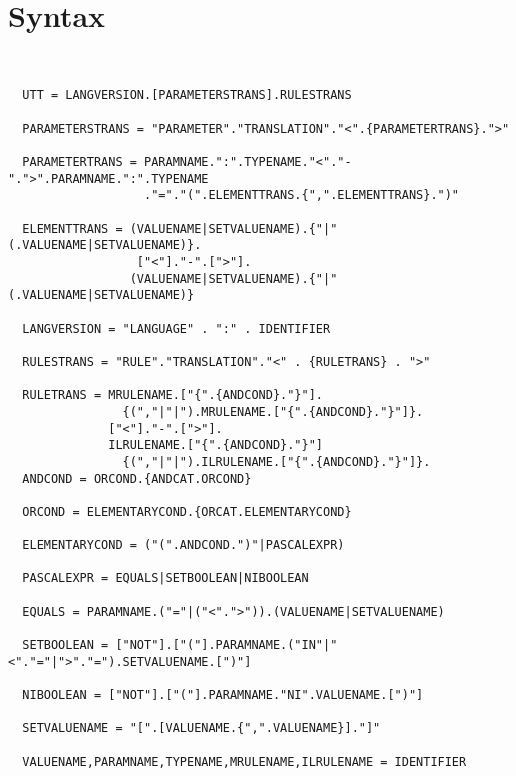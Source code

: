\section{Syntax}
\begin{verbatim}


  UTT = LANGVERSION.[PARAMETERSTRANS].RULESTRANS

  PARAMETERSTRANS = "PARAMETER"."TRANSLATION"."<".{PARAMETERTRANS}.">"

  PARAMETERTRANS = PARAMNAME.":".TYPENAME."<"."-".">".PARAMNAME.":".TYPENAME
                   ."="."(".ELEMENTTRANS.{",".ELEMENTTRANS}.")"

  ELEMENTTRANS = (VALUENAME|SETVALUENAME).{"|"(.VALUENAME|SETVALUENAME)}.
                  ["<"]."-".[">"].
                 (VALUENAME|SETVALUENAME).{"|"(.VALUENAME|SETVALUENAME)}

  LANGVERSION = "LANGUAGE" . ":" . IDENTIFIER

  RULESTRANS = "RULE"."TRANSLATION"."<" . {RULETRANS} . ">"

  RULETRANS = MRULENAME.["{".{ANDCOND}."}"].
                {(","|"|").MRULENAME.["{".{ANDCOND}."}"]}.
              ["<"]."-".[">"].
              ILRULENAME.["{".{ANDCOND}."}"]
                {(","|"|").ILRULENAME.["{".{ANDCOND}."}"]}.
  ANDCOND = ORCOND.{ANDCAT.ORCOND}

  ORCOND = ELEMENTARYCOND.{ORCAT.ELEMENTARYCOND}

  ELEMENTARYCOND = ("(".ANDCOND.")"|PASCALEXPR)

  PASCALEXPR = EQUALS|SETBOOLEAN|NIBOOLEAN

  EQUALS = PARAMNAME.("="|("<".">")).(VALUENAME|SETVALUENAME)

  SETBOOLEAN = ["NOT"].["("].PARAMNAME.("IN"|"<"."="|">"."=").SETVALUENAME.[")"]

  NIBOOLEAN = ["NOT"].["("].PARAMNAME."NI".VALUENAME.[")"]

  SETVALUENAME = "[".[VALUENAME.{",".VALUENAME}]."]"

  VALUENAME,PARAMNAME,TYPENAME,MRULENAME,ILRULENAME = IDENTIFIER

\end{verbatim}
